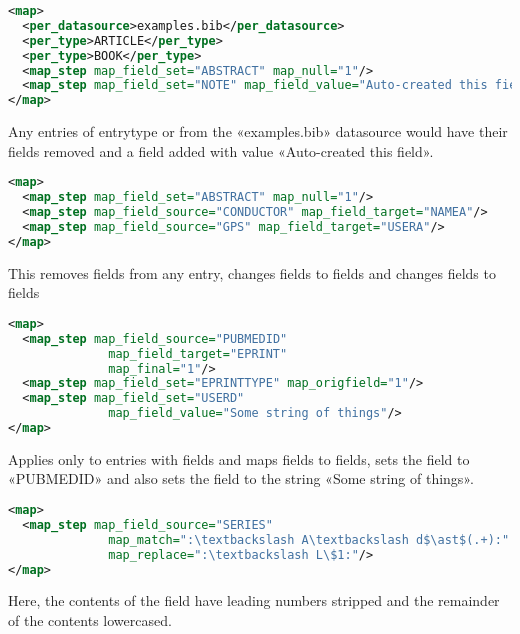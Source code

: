 \documentclass{ltxdockit}
\begin{document}
\begin{lstlisting}[language=xml,escapechar=+,mathescape=true]
<map>
  <per_datasource>examples.bib</per_datasource>
  <per_type>ARTICLE</per_type>
  <per_type>BOOK</per_type>
  <map_step map_field_set="ABSTRACT" map_null="1"/>
  <map_step map_field_set="NOTE" map_field_value="Auto-created this field"/>
</map>
\end{lstlisting}

\noindent Any entries of entrytype  or  from the
«examples.bib» datasource would have their 
fields removed and a  field added with value «Auto-created this field».

\begin{lstlisting}[language=xml,escapechar=:,mathescape=true]
<map>
  <map_step map_field_set="ABSTRACT" map_null="1"/>
  <map_step map_field_source="CONDUCTOR" map_field_target="NAMEA"/>
  <map_step map_field_source="GPS" map_field_target="USERA"/>
</map>
\end{lstlisting}

\noindent This removes  fields from any entry, changes
 fields to  fields and changes 
fields to  fields

\begin{lstlisting}[language=xml,escapechar=:,mathescape=true]
<map>
  <map_step map_field_source="PUBMEDID"
              map_field_target="EPRINT"
              map_final="1"/>
  <map_step map_field_set="EPRINTTYPE" map_origfield="1"/>
  <map_step map_field_set="USERD"
              map_field_value="Some string of things"/>
</map>
\end{lstlisting}

\noindent Applies only to entries with  fields and maps
 fields to  fields, sets the 
field to «PUBMEDID» and also sets the  field to the string
«Some string of things».

\begin{lstlisting}[language=xml,escapechar=:,mathescape=true]
<map>
  <map_step map_field_source="SERIES"
              map_match=":\textbackslash A\textbackslash d$\ast$(.+):"
              map_replace=":\textbackslash L\$1:"/>
</map>
\end{lstlisting}

\noindent Here, the contents of the 
field have leading numbers stripped and the remainder of the contents
lowercased.
\end{document}
